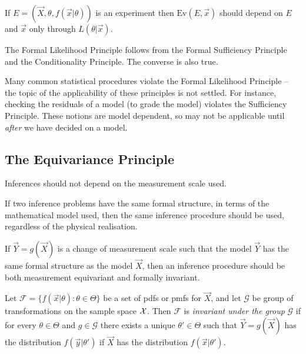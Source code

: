 \begin{corollary}
    If $E = (\vec{X}, \theta, f(\vec{x} \vert{} \theta))$ is an experiment then $\text{Ev}(E, \vec{x})$ should depend on $E$ and $\vec{x}$ only through $L(\theta \vert{} \vec{x})$.
\end{corollary}

\begin{theorem}
    The Formal Likelihood Principle follows from the Formal Sufficiency Principle and the Conditionality Principle. The converse is also true.
\end{theorem}

\begin{remark}
    Many common statistical procedures violate the Formal Likelihood Principle -- the topic of the applicability of these principles is not settled. For instance, checking the residuals of a model (to grade the model) violates the Sufficiency Principle. These notions are model dependent, so may not be applicable until \emph{after} we have decided on a model.
\end{remark}
    
\subsection{The Equivariance Principle}

\begin{definition}
    Inferences should not depend on the measurement scale used.
\end{definition}

\begin{definition}
    If two inference problems have the same formal structure, in terms of the mathematical model used, then the same inference procedure should be used, regardless of the physical realisation.
\end{definition}

\begin{definition}
    If $\vec{Y} = g(\vec{X})$ is a change of measurement scale such that the model $\vec{Y}$ has the same formal structure  as the model $\vec{X}$, then an inference procedure should be both measurement equivariant and formally invariant.
\end{definition}

\begin{definition}
    Let $\mathcal{F} = \{f(\vec{x} \vert{} \theta): \theta \in \Theta\}$ be a set of pdfs or pmfs for $\vec{X}$, and let $\mathcal{G}$ be  group of transformations on the sample space $\mathcal{X}{}$. Then $\mathcal{F}$ is \emph{invariant under the group} $\mathcal{G}$ if for every $\theta \in \Theta$ and $g \in \mathcal{G}$ there exists a unique $\theta' \in \Theta$ such that $\vec{Y} = g(\vec{X})$ has the distribution $f(\vec{y} \vert{} \theta')$ if $\vec{X}$ has the distribution $f(\vec{x} \vert{} \theta')$.
\end{definition}


    
    
    
    
    
    
    
    
    
    
    
    
    

    
    
    
    
    